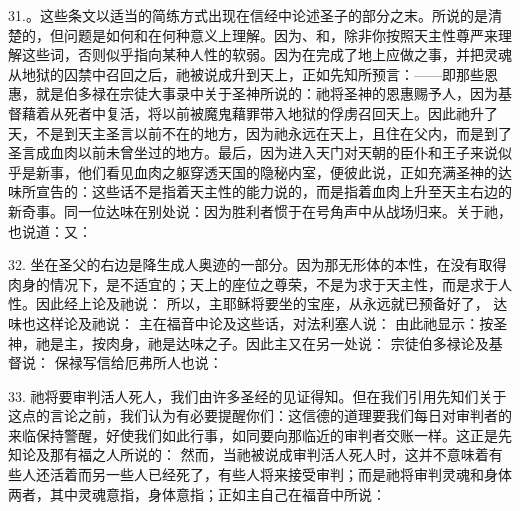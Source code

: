 31.\newline{}。\newline{}\newline{}这些条文以适当的简练方式出现在信经中论述圣子的部分之末。所说的是清楚的，但问题是如何和在何种意义上理解。因为、和，除非你按照天主性尊严来理解这些词，否则似乎指向某种人性的软弱。因为在完成了地上应做之事，并把灵魂从地狱的囚禁中召回之后，祂被说成升到天上，正如先知所预言：——即那些恩惠，就是伯多禄在宗徒大事录中关于圣神所说的：祂将圣神的恩惠赐予人，因为基督藉着从死者中复活，将以前被魔鬼藉罪带入地狱的俘虏召回天上。\newline{}\newline{}因此祂升了天，不是到天主圣言以前不在的地方，因为祂永远在天上，且住在父内，而是到了圣言成血肉以前未曾坐过的地方。最后，因为进入天门对天朝的臣仆和王子来说似乎是新事，他们看见血肉之躯穿透天国的隐秘内室，便彼此说，正如充满圣神的达味所宣告的：这些话不是指着天主性的能力说的，而是指着血肉上升至天主右边的新奇事。同一位达味在别处说：因为胜利者惯于在号角声中从战场归来。关于祂，也说道：又：\par

32. 坐在圣父的右边是降生成人奥迹的一部分。因为那无形体的本性，在没有取得肉身的情况下，是不适宜的；天上的座位之尊荣，不是为求于天主性，而是求于人性。因此经上论及祂说： 所以，主耶稣将要坐的宝座，从永远就已预备好了， 达味也这样论及祂说： 主在福音中论及这些话，对法利塞人说： 由此祂显示：按圣神，祂是主，按肉身，祂是达味之子。因此主又在另一处说： 宗徒伯多禄论及基督说： 保禄写信给厄弗所人也说：\par

33. 祂将要审判活人死人，我们由许多圣经的见证得知。但在我们引用先知们关于这点的言论之前，我们认为有必要提醒你们：这信德的道理要我们每日对审判者的来临保持警醒，好使我们如此行事，如同要向那临近的审判者交账一样。这正是先知论及那有福之人所说的： 然而，当祂被说成审判活人死人时，这并不意味着有些人还活着而另一些人已经死了，有些人将来接受审判；而是祂将审判灵魂和身体两者，其中灵魂意指，身体意指；正如主自己在福音中所说：\par

